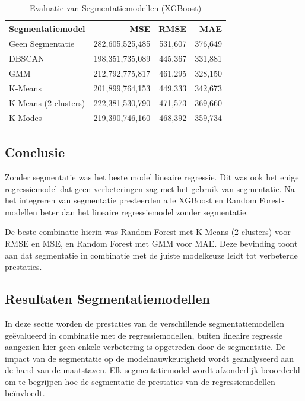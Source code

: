 \begin{table}[H]
    \centering
    \caption{Evaluatie van Segmentatiemodellen (XGBoost)}
    \label{tab:segmentation_model_evaluation_xgboost}
    \begin{tabular}{|l|r|r|r|}
        \hline
        \textbf{Segmentatiemodel} & \textbf{MSE} & \textbf{RMSE} & \textbf{MAE} \\ \hline
        Geen Segmentatie         & 282,605,525,485 & 531,607 & 376,649 \\ \hline
        DBSCAN                   & 198,351,735,089 & 445,367 & 331,881 \\ \hline
        GMM                      & 212,792,775,817 & 461,295 & 328,150 \\ \hline
        K-Means                  & 201,899,764,153 & 449,333 & 342,673 \\ \hline
        K-Means (2 clusters)     & 222,381,530,790 & 471,573 & 369,660 \\ \hline
        K-Modes                  & 219,390,746,160 & 468,392 & 359,734 \\ \hline
    \end{tabular}
\end{table}


\subsection*{Conclusie}

Zonder segmentatie was het beste model lineaire regressie. Dit was ook het enige regressiemodel dat geen verbeteringen zag met het gebruik van segmentatie. Na het integreren van segmentatie presteerden alle XGBoost en Random Forest-modellen beter dan het lineaire regressiemodel zonder segmentatie.

\vspace{1em}

De beste combinatie hierin was Random Forest met K-Means (2 clusters) voor RMSE en MSE, en Random Forest met GMM voor MAE. Deze bevinding toont aan dat segmentatie in combinatie met de juiste modelkeuze leidt tot verbeterde prestaties.

\newpage

\subsection{Resultaten Segmentatiemodellen}

In deze sectie worden de prestaties van de verschillende segmentatiemodellen geëvalueerd in combinatie met de regressiemodellen, buiten lineaire regressie aangezien hier geen enkele verbetering is opgetreden door de segmentatie. De impact van de segmentatie op de modelnauwkeurigheid wordt geanalyseerd aan de hand van de maatstaven. Elk segmentatiemodel wordt afzonderlijk beoordeeld om te begrijpen hoe de segmentatie de prestaties van de regressiemodellen beïnvloedt.


